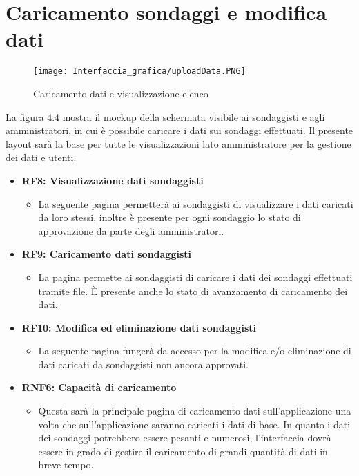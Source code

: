 \section{Caricamento sondaggi e modifica dati}
    \begin{figure}[H]
        \center
        \texttt{[image: Interfaccia\_grafica/uploadData.PNG]}
        \caption{Caricamento dati e visualizzazione elenco}
    \end{figure} 
    La figura 4.4 mostra il mockup della schermata visibile ai sondaggisti e agli amministratori, in cui è possibile caricare i dati sui sondaggi effettuati.\newline
    Il presente layout sarà la base per tutte le visualizzazioni lato amministratore per la gestione dei dati e utenti.
    \begin{itemize}
        \item \textbf{RF8: Visualizzazione dati sondaggisti} \begin{itemize}
            \item La seguente pagina permetterà ai sondaggisti di visualizzare i dati caricati da loro stessi, inoltre è presente per ogni sondaggio lo stato di approvazione da parte degli amministratori.
        \end{itemize}
        \item \textbf{RF9: Caricamento dati sondaggisti} \begin{itemize}
            \item La pagina permette ai sondaggisti di caricare i dati dei sondaggi effettuati tramite file. È presente anche lo stato di avanzamento di caricamento dei dati.
        \end{itemize}
        \item \textbf{RF10: Modifica ed eliminazione dati sondaggisti} \begin{itemize}
            \item La seguente pagina fungerà da accesso per la modifica e/o eliminazione di dati caricati da sondaggisti non ancora approvati.
        \end{itemize}
        \item \textbf{RNF6: Capacità di caricamento} \begin{itemize}
            \item Questa sarà la principale pagina di caricamento dati sull'applicazione una volta che sull'applicazione saranno caricati i dati di base. In quanto i dati dei sondaggi potrebbero essere pesanti e numerosi, l'interfaccia dovrà essere in grado di gestire il caricamento di grandi quantità di dati in breve tempo.

\end{itemize}
\end{itemize}
